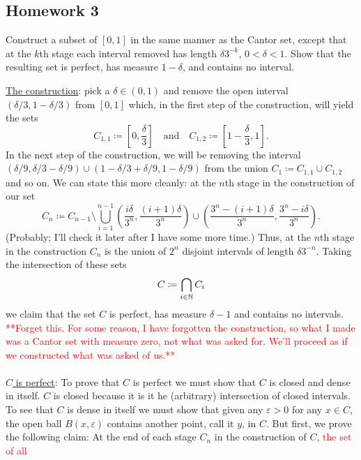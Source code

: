 \subsection{Homework 3}
\begin{problem}
  Construct a subset of $[0,1]$ in the same manner as the Cantor set,
  except that at the $k$th stage each interval removed has length
  $\delta 3^{-k}$, $0<\delta<1$. Show that the resulting set is perfect,
  has measure $1-\delta$, and contains no interval.
\end{problem}
\begin{solution}
  \underline{The construction}: pick a $\delta\in(0,1)$ and remove the
  open interval $(\delta/3,1-\delta/3)$ from $[0,1]$ which, in the first
  step of the construction, will yield the sets
  \[
    C_{1,1}\coloneq\left[0,\frac{\delta}{3}\right]\quad\text{and}\quad
    C_{1,2}\coloneq\left[1-\frac{\delta}{3},1\right].
  \]
  In the next step of the construction, we will be removing the interval
  $(\delta/9,\delta/3-\delta/9)\cup(1-\delta/3+\delta/9,1-\delta/9)$ from
  the union $C_1\coloneq C_{1,1}\cup C_{1,2}$ and so on. We can state this
  more cleanly: at the $n$th stage in the construction of our set
  \[
    C_n\coloneq%
    C_{n-1}\setminus\bigcup_{i=1}^{n-1}%
    \left(\frac{i\delta}{3^n},\frac{(i+1)\delta}{3^n}\right)\cup%
    \left(\frac{3^n-(i+1)\delta}{3^n},\frac{3^n-i\delta}{3^n}\right).
  \]
  (Probably; I'll check it later after I have some more time.)  Thus, at
  the $n$th stage in the construction $C_n$ is the union of $2^n$ disjoint
  intervals of length $\delta 3^{-n}$. Taking the intersection of these
  sets
  \[
    C\coloneq\bigcap_{i\in\mathbb{N}} C_i
  \]
  we claim that the set $C$ is perfect, has measure $\delta-1$ and contains
  no intervals. \textcolor{Red}{**Forget this. For some reason, I have
    forgotten the construction, so what I made was a Cantor set with
    measure zero, not what was asked for. We'll proceed as if we
    constructed what was asked of us.**}
  \\\\
  \underline{$C$ is perfect}: To prove that $C$ is perfect we must show
  that $C$ is closed and dense in itself. $C$ is closed because it is it he
  (arbitrary) intersection of closed intervals. To see that $C$ is dense in
  itself we must show that given any $\varepsilon>0$ for any $x\in C$, the
  open ball $B(x,\varepsilon)$ contains another point, call it $y$, in
  $C$. But first, we prove the following claim: At the end of each stage
  $C_n$ in the construction of $C$, \textcolor{Red}{the set of all
}
\end{solution}
